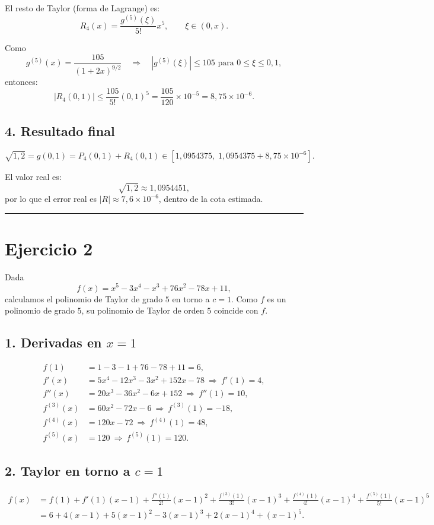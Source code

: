 \documentclass[12pt]{article}
\begin{document}
El resto de Taylor (forma de Lagrange) es:
\[
R_4(x) = \frac{g^{(5)}(\xi)}{5!}x^5, \qquad \xi \in (0,x).
\]

Como
\[
g^{(5)}(x) = \frac{105}{(1+2x)^{9/2}} \quad \Rightarrow \quad |g^{(5)}(\xi)| \le 105 \text{ para } 0 \le \xi \le 0{,}1,
\]
entonces:
\[
|R_4(0{,}1)| \le \frac{105}{5!}(0{,}1)^5 = \frac{105}{120}\times 10^{-5} = \boxed{8{,}75\times 10^{-6}.}
\]

\subsection*{4. Resultado final}

\[
\sqrt{1{,}2} = g(0{,}1) = P_4(0{,}1) + R_4(0{,}1) \in 
\left[1{,}0954375,\;1{,}0954375 + 8{,}75\times10^{-6}\right].
\]

El valor real es:
\[
\sqrt{1{,}2} \approx 1{,}0954451,
\]
por lo que el error real es \(|R|\approx 7{,}6\times10^{-6}\), dentro de la cota estimada.

\bigskip
\hrule
\bigskip

\section*{Ejercicio 2}
Dada
\[
f(x)=x^{5}-3x^{4}-x^{3}+76x^{2}-78x+11,
\]
calculamos el polinomio de Taylor de grado \(5\) en torno a \(c=1\). Como \(f\) es un polinomio de grado \(5\),
su polinomio de Taylor de orden \(5\) coincide con \(f\).

\subsection*{1. Derivadas en \(x=1\)}
\[
\begin{aligned}
f(1)&=1-3-1+76-78+11=6,\\
f'(x)&=5x^{4}-12x^{3}-3x^{2}+152x-78 \ \Rightarrow\ f'(1)=4,\\
f''(x)&=20x^{3}-36x^{2}-6x+152 \ \Rightarrow\ f''(1)=10,\\
f^{(3)}(x)&=60x^{2}-72x-6 \ \Rightarrow\ f^{(3)}(1)=-18,\\
f^{(4)}(x)&=120x-72 \ \Rightarrow\ f^{(4)}(1)=48,\\
f^{(5)}(x)&=120 \ \Rightarrow\ f^{(5)}(1)=120.
\end{aligned}
\]

\subsection*{2. Taylor en torno a \(c=1\)}
\[
\begin{aligned}
f(x)
&= f(1)+f'(1)(x-1)+\frac{f''(1)}{2!}(x-1)^2+\frac{f^{(3)}(1)}{3!}(x-1)^3
+\frac{f^{(4)}(1)}{4!}(x-1)^4+\frac{f^{(5)}(1)}{5!}(x-1)^5\\[2mm]
&= 6+4(x-1)+5(x-1)^2-3(x-1)^3+2(x-1)^4+(x-1)^5.
\end{aligned}
\]
\end{document}
